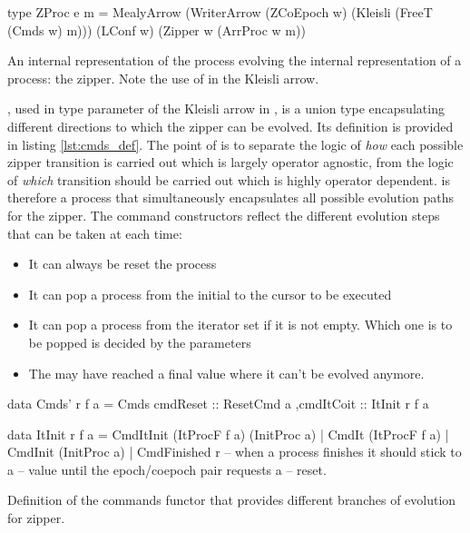 \begin{code}
\begin{haskellcode}
type ZProc e m =
  MealyArrow
    (WriterArrow (ZCoEpoch w) (Kleisli (FreeT (Cmds w) m)))
    (LConf w)
    (Zipper w (ArrProc w m))
\end{haskellcode}
  \caption{\label{lst:zproc_def}An internal representation of the
    process evolving the internal representation of a process: the
    zipper. Note the use of  in the Kleisli arrow.}
\end{code}


, used in type parameter of the Kleisli arrow in
, is a union type encapsulating different directions to
which the zipper can be evolved. Its definition is provided in listing
\ref{lst:cmds_def}. The point of  is to separate the logic
of \emph{how} each possible zipper transition is carried out which is
largely operator agnostic, from the logic of \emph{which} transition
should be carried out which is highly operator dependent.  
is therefore a process that simultaneously encapsulates all possible
evolution paths for the zipper.  The command constructors reflect the
different evolution steps that can be taken at each time:

\begin{itemize}
\item It can always be reset the process
\item It can pop a process from the initial to the cursor to be executed
\item It can pop a process from the iterator set if it is not
  empty. Which one is to be popped is decided by the parameters
\item The may have reached a final value where it can't be evolved
  anymore.
\end{itemize}


\begin{code}
\begin{haskellcode}
data Cmds' r f a =
  Cmds { cmdReset :: ResetCmd a
        ,cmdItCoit :: ItInit r f a
       }

data ItInit r f a
  = CmdItInit (ItProcF f a) (InitProc a)
  | CmdIt (ItProcF f a)
  | CmdInit (InitProc a)
  | CmdFinished r -- when a process finishes it should stick to a
                  -- value until the epoch/coepoch pair requests a
                  -- reset.
\end{haskellcode}
  \caption{\label{lst:cmds_def}Definition of the commands functor that
    provides different branches of evolution for zipper.}
\end{code}

